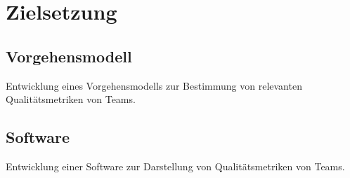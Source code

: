 \chapter{Zielsetzung}

\section{Vorgehensmodell}

Entwicklung eines Vorgehensmodells zur Bestimmung von relevanten Qualitätsmetriken von Teams.

\section{Software}

Entwicklung einer Software zur Darstellung von Qualitätsmetriken von Teams.
